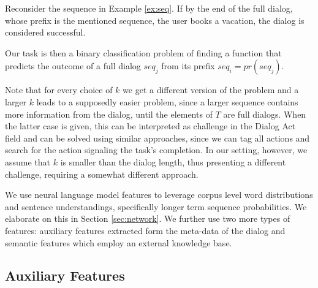\begin{example}
Reconsider the sequence in Example \ref{ex:seq}.  
If by the end of the full dialog, whose prefix is the mentioned sequence, 
the user books a vacation, the dialog is considered successful.
\end{example}


Our task is then a binary classification 
problem of finding a function that predicts the outcome 
of a full dialog $seq_j$ from its prefix $seq_i = pr(seq_j)$. 

Note that for every choice of $k$ we get a different 
version of the problem and a larger $k$ leads 
to a supposedly easier problem, since a larger sequence contains 
more information from the dialog, until the elements of $T$ 
are full dialogs. When the latter case is 
given, this can be interpreted as challenge in the Dialog Act field \cite{cs-CL-0006023,DBLP:conf/icassp/JiB05,DBLP:conf/coling/WermterL96} and can be solved using similar approaches, since we 
can tag all actions and search for the action signaling the task's completion. 
In our setting, however, we assume that $k$ is smaller than the dialog 
length, thus presenting a different challenge, requiring a somewhat different approach. 

We use neural language model features to leverage corpus
level word distributions and sentence understandings, 
specifically longer term
sequence probabilities. 
We elaborate on this in Section \ref{sec:network}. 
We further use two more types of features: auxiliary features 
extracted form the meta-data of the dialog and semantic features 
which employ an external knowledge base.


\subsection{Auxiliary Features}\label{sec:sem}


